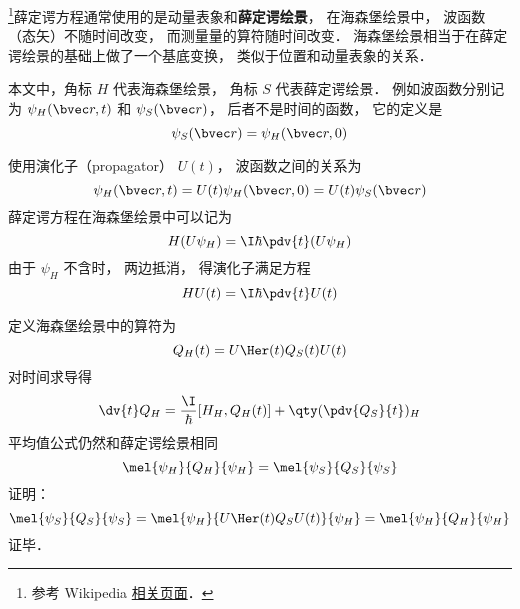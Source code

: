 
\begin{issues}
\issueDraft
\end{issues}


\footnote{参考 Wikipedia \href{https://en.wikipedia.org/wiki/Heisenberg_picture}{相关页面}．}薛定谔方程通常使用的是动量表象和\textbf{薛定谔绘景}， 在海森堡绘景中， 波函数（态矢）不随时间改变， 而测量量的算符随时间改变． 海森堡绘景相当于在薛定谔绘景的基础上做了一个基底变换， 类似于位置和动量表象的关系．

本文中，角标 $H$ 代表海森堡绘景， 角标 $S$ 代表薛定谔绘景． 例如波函数分别记为 $\psi_H(\bvec r, t)$ 和 $\psi_S(\bvec r)$， 后者不是时间的函数， 它的定义是
\begin{equation}
\psi_S(\bvec r) = \psi_H(\bvec r, 0)
\end{equation}


使用演化子（propagator） $U(t)$， 波函数之间的关系为
\begin{equation}
\psi_H(\bvec r, t) = U(t) \psi_H(\bvec r, 0) = U(t) \psi_S(\bvec r)
\end{equation}
薛定谔方程在海森堡绘景中可以记为
\begin{equation}
H(U\psi_H) = \I\hbar \pdv{t} (U\psi_H)
\end{equation}
由于 $\psi_H$ 不含时， 两边抵消， 得演化子满足方程
\begin{equation}
H U(t) = \I\hbar \pdv{t} U(t)
\end{equation}

定义海森堡绘景中的算符为
\begin{equation}
Q_H(t) = U\Her(t) Q_S(t) U(t)
\end{equation}
对时间求导得
\begin{equation}
\dv{t}Q_H = \frac{\I}{\hbar} [H_H, Q_H(t)] + \qty(\pdv{Q_S}{t})_H
\end{equation}
平均值公式仍然和薛定谔绘景相同
\begin{equation}
\mel{\psi_H}{Q_H}{\psi_H} = \mel{\psi_S}{Q_S}{\psi_S}
\end{equation}
证明：
\begin{equation}
\mel{\psi_S}{Q_S}{\psi_S} = \mel{\psi_H}{U\Her(t)Q_SU(t)}{\psi_H} = \mel{\psi_H}{Q_H}{\psi_H}
\end{equation}
证毕．
